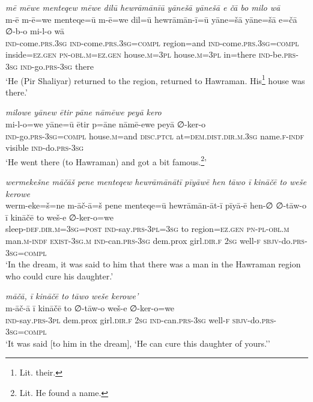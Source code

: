 \ea \label{ŽP.141}
\textit{mē mēwe menteqew mēwe dilū hewrāmānīū yānešā yānešā e čā bo milo wā} \\ 
\gll m-ē m-ē=we menteqe=ū m-ē=we dil=ū hewrāmān-ī=ū yāne=šā yāne=šā e=čā ∅-b-o mi-l-o wā \\ 
 \textsc{ind-}come\textsc{.prs}\textsc{.3sg} \textsc{ind-}come\textsc{.prs}\textsc{.3sg}\textsc{=compl} region=and \textsc{ind-}come\textsc{.prs}\textsc{.3sg}\textsc{=compl} inside\textsc{\textsc{=ez.gen}} \textsc{pn}\textsc{-obl}\textsc{.m}\textsc{\textsc{=ez.gen}} house\textsc{.m}\textsc{=3pl} house\textsc{.m}\textsc{=3pl} in=there \textsc{ind-}be\textsc{.prs}\textsc{-3sg} \textsc{ind-}go\textsc{.prs}\textsc{-3sg} there \\ 
\glt `He (Pir Shaliyar) returned to the region, returned to Hawraman. His\footnote{Lit. their.} house was there.'
\z 
 
\ea \label{ŽP.143}
\textit{milowe yānew ētir pāne nāmēwe peyā kero} \\ 
\gll mi-l-o=we yāne=ū ētir p=āne nāmē-ewe peyā ∅-ker-o \\ 
 \textsc{ind-}go\textsc{.prs}\textsc{-3sg}\textsc{=compl} house\textsc{.m}=and \textsc{disc.ptcl} at=\textsc{dem.dist}\textsc{.dir}\textsc{.m}\textsc{.3sg} name\textsc{.f}\textsc{-indf} visible \textsc{ind-}do\textsc{.prs}\textsc{-3sg} \\ 
\glt `He went there (to Hawraman) and got a bit famous.\footnote{Lit. He found a name.}'
\z 
 
\ea \label{ŽP.154}
\textit{wermekešne māčāš pene menteqew hewrāmānātī pīyāwē hen tāwo ī kināčē to weše kerowe} \\ 
\gll werm-eke=š=ne m-āč-ā=š pene menteqe=ū hewrāmān-āt-ī pīyā-ē hen-∅ ∅-tāw-o ī kināčē to weš-e ∅-ker-o=we \\ 
 sleep\textsc{-def}\textsc{.dir}\textsc{.m}\textsc{=3sg}\textsc{=\textsc{post}} \textsc{ind-}say\textsc{.prs}\textsc{-3pl}\textsc{=3sg} to region=\textsc{ez.gen} \textsc{pn}\textsc{\textsc{-pl}}\textsc{-obl}\textsc{.m} man\textsc{.m}\textsc{-indf} \textsc{exist}\textsc{-3sg}\textsc{.m} \textsc{ind-}can\textsc{.prs}\textsc{-3sg} dem.prox girl\textsc{.dir}\textsc{.f} \textsc{2sg} well\textsc{-f} \textsc{sbjv-}do\textsc{.prs}\textsc{-3sg}\textsc{=compl} \\ 
\glt `In the dream, it was said to him that there was a man in the Hawraman region who could cure his daughter.'
\z 
 
\ea \label{ŽP.156}
\textit{māčā, ī kināčē to tāwo weše kerowe’} \\ 
\gll m-āč-ā ī kināčē to ∅-tāw-o weš-e ∅-ker-o=we \\ 
 \textsc{ind-}say\textsc{.prs}\textsc{-3pl} dem.prox girl\textsc{.dir}\textsc{.f} \textsc{2sg} \textsc{ind-}can\textsc{.prs}\textsc{-3sg} well\textsc{-f} \textsc{sbjv-}do\textsc{.prs}\textsc{-3sg}\textsc{=compl} \\ 
\glt `It was said [to him in the dream], ‘He can cure this daughter of yours.’'
\z 
 

